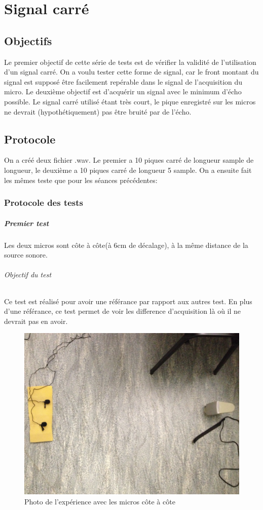 \documentclass[12pt,a4paper]{report}
\begin{document}
\chapter{Signal carré}\label{signal_carre}
\section{Objectifs}
	Le premier objectif de cette série de tests est de vérifier la validité de l'utilisation d'un signal carré.
	On a voulu tester cette forme de signal, car le front montant du signal est supposé être facilement repérable dans le signal de l'acquisition du micro.
	Le deuxième objectif est d'acquérir un signal avec le minimum d'écho possible. Le signal carré utilisé étant très court, le pique enregistré sur les micros ne devrait (hypothétiquement) pas être bruité par de l'écho.

\section{Protocole}\label{protocole}
	On a créé deux fichier .wav. Le premier a 10 piques carré de longueur sample de longueur, le deuxième a 10 piques carré de longueur 5 sample.
	On a ensuite fait les mêmes teste que pour les séances précédentes:

\subsection{Protocole des tests}
 
 \paragraph{Premier test} 
 Les deux micros sont côte à côte(à 6cm de décalage), à la même distance de la source sonore.
 \subparagraph{Objectif du test}
 Ce test est réalisé pour avoir une référance par rapport aux autres test. En plus d'une référance, ce test permet de voir les difference d'acquisition là où il ne devrait pas en avoir.
 \begin{figure}[H]
 \includegraphics[width=\textwidth]{../tests/lecture_de_signaux_carres/donnees11-03/test_1.jpg} 
 \caption{Photo de l'expérience avec les micros côte à côte}
 \end{figure}
 	
\end{document}
